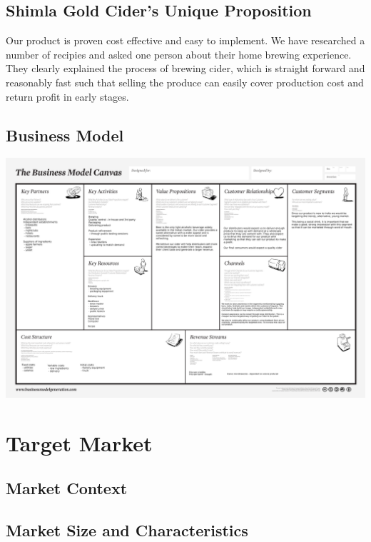 \documentclass[11pt]{article}
\begin{document}
  \subsection{Shimla Gold Cider's Unique Proposition}
Our product is proven cost effective and easy to implement. We have researched a number of recipies and asked one person about their home brewing experience. They clearly explained the process of brewing cider, which is straight forward and reasonably fast such that selling the produce can easily cover production cost and return profit in early stages.
  
  \newpage
  \subsection{Business Model}
  \includegraphics[angle=90,width=\textwidth,height=\textheight,keepaspectratio]{./business_model_canvas_poster.png}

\newpage


\section{Target Market}
  \subsection{Market Context}
  \subsection{Market Size and Characteristics}
\end{document}
